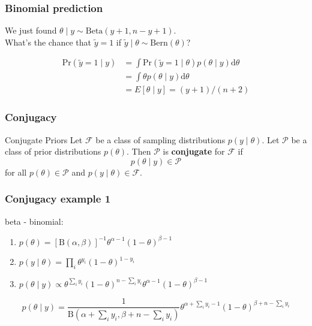 \documentclass{beamer}
\begin{document}
\begin{frame}[fragile]
\frametitle{Binomial prediction}

We just found $\theta \mid y \sim \text{Beta}(y+1, n-y+1)$. \\
What's the chance that $\tilde{y} = 1$ if $\tilde{y} \mid \theta \sim \text{Bern}(\theta)$?
\pause

\begin{align*}
\text{Pr}(\tilde{y}=1 \mid y) &= \int \text{Pr}(\tilde{y} =1 \mid \theta) p(\theta \mid y) \text{d}\theta \\
&= \int \theta p(\theta \mid y) \text{d}\theta \\
&= E[\theta \mid y] = (y+1)/(n+2)
\end{align*}


\end{frame}




\begin{frame}[fragile]
\frametitle{Conjugacy}

\begin{block}{Conjugate Priors}
Let $\mathcal{F}$ be a class of sampling distributions $p(y \mid \theta)$. Let $\mathcal{P}$ be a class of prior distributions $p(\theta)$. Then $\mathcal{P}$ is {\bf conjugate} for $\mathcal{F}$ if 
\[
p(\theta \mid y) \in \mathcal{P}
\]
for all $p(\theta) \in \mathcal{P}$ and $p(y \mid \theta) \in \mathcal{F}$.
\end{block}

\end{frame}


\begin{frame}[fragile]
\frametitle{Conjugacy example 1}

beta - binomial:
\begin{enumerate}
\item $p(\theta) = [\text{B}(\alpha,\beta)]^{-1} \theta^{\alpha-1}(1-\theta)^{\beta-1}$
\item $p(y \mid \theta) = \prod_i \theta^{y_i}(1-\theta)^{1-y_i} $
\item $p(\theta \mid y) \propto \theta^{\sum_i y_i}(1-\theta)^{n-\sum_i y_i}\theta^{\alpha-1}(1-\theta)^{\beta-1}$
\end{enumerate}


\[
p(\theta \mid y) = \frac{1}{\text{B}(\alpha + \sum_i y_i, \beta + n - \sum_i y_i)} \theta^{\alpha + \sum_i y_i - 1}(1-\theta)^{\beta + n-\sum_i y_i}
\]

\end{frame}
\end{document}
